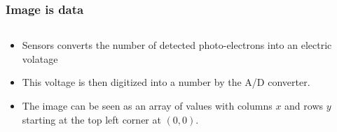 \documentclass[ignorenonframetext,aspectratio=169,10pt,xcolor=table]{beamer}
\begin{document}
\begin{frame} \frametitle{Image is data}

  \begin{columns}

    \begin{column}{.5\textwidth}
      \begin{itemize} \setlength\itemsep{1em}
      \item Sensors converts the number of detected photo-electrons
        into an electric volatage
      \item This voltage is then digitized into a number by the A/D
        converter.
      \item The image can be seen as an array of values with columns
        $x$ and rows $y$ starting at the top left corner at $(0,0)$.
      \end{itemize}
      \end{column}

    \begin{column}{.5\textwidth}
    \end{column}

  \end{columns}

\end{frame}
\end{document}
